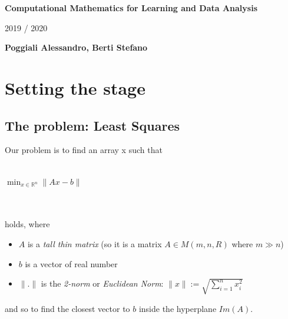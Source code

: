 \documentclass{article}
\begin{document}
\thispagestyle{plain}
\begin{center}
    \Large
    \textbf{Computational Mathematics for Learning and Data Analysis}

    \vspace{0.4cm}
    \large
    2019 / 2020

    \vspace{0.4cm}
    \textbf{Poggiali Alessandro, Berti Stefano}

    \vspace{0.9cm}
\end{center}

\newpage
\section{Setting the stage}\label{sec:setting-the-stage}

\subsection{The problem: Least Squares}\label{subsec:linear-square-problem}
Our problem is to find an array x such that \\\\
\centerline{$\min_{x \in \mathds{R}^n}\|Ax-b\|$} \\\\
holds, where
\begin{itemize}
	\item $A$ is a \textit{tall thin matrix} (so it is a matrix $A\in M(m, n, R)$ where $m \gg n$)
	\item $b$ is a vector of real number
	\item $\|.\|$ is the \textit{2-norm} or \textit{Euclidean Norm}: $\|x\| := \sqrt{\sum_{i=1}^n x_i^2}$
\end{itemize}
and so to find the closest vector to $b$ inside the hyperplane $Im(A)$.

\end{document}
